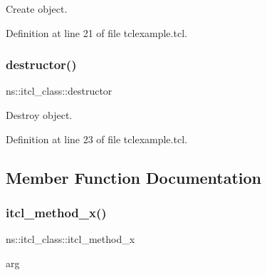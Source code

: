 Create object. 



Definition at line 21 of file tclexample.\+tcl.


\begin{DoxyCode}{0}

\end{DoxyCode}
\mbox{\label{classns_1_1itcl__class_ac72f3174993656391f9b54487aa4795e}} 
\subsubsection{\texorpdfstring{destructor()}{destructor()}}
{\footnotesize\ttfamily ns\+::itcl\+\_\+class\+::destructor}



Destroy object. 



Definition at line 23 of file tclexample.\+tcl.


\begin{DoxyCode}{0}

\end{DoxyCode}


\subsection{Member Function Documentation}
\mbox{\label{classns_1_1itcl__class_abc59160f823f3a6ec8c292c034aedbc3}} 
\subsubsection{\texorpdfstring{itcl\_method\_x()}{itcl\_method\_x()}\hspace{0.1cm}{\footnotesize\ttfamily [1/2]}}
{\footnotesize\ttfamily ns\+::itcl\+\_\+class\+::itcl\+\_\+method\+\_\+x\begin{DoxyParamCaption}\item[{}]{arg  }\end{DoxyParamCaption}}



